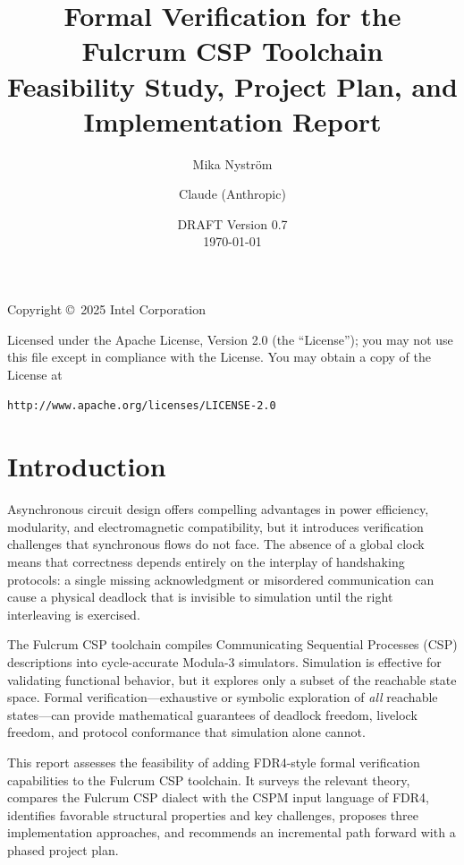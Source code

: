 \documentclass[11pt]{article}
\title{\textbf{Formal Verification for the Fulcrum CSP Toolchain} \\[0.5em]
\large Feasibility Study, Project Plan, and Implementation Report}
\author{Mika Nystr\"om \and Claude (Anthropic)}
\date{DRAFT Version 0.7\\
\today}
\begin{document}
\maketitle

\vspace{1em}

\noindent
 Copyright \copyright\ 2025 Intel Corporation

 Licensed under the Apache License, Version 2.0 (the ``License'');
 you may not use this file except in compliance with the License.
 You may obtain a copy of the License at

 {\tt http://www.apache.org/licenses/LICENSE-2.0}

\tableofcontents
\newpage

\section{Introduction}

Asynchronous circuit design offers compelling advantages in power
efficiency, modularity, and electromagnetic compatibility, but it
introduces verification challenges that synchronous flows do not face.
The absence of a global clock means that correctness depends entirely on
the interplay of handshaking protocols: a single missing acknowledgment
or misordered communication can cause a physical deadlock that is
invisible to simulation until the right interleaving is exercised.

The Fulcrum CSP toolchain compiles Communicating Sequential Processes
(CSP) descriptions into cycle-accurate Modula-3 simulators.  Simulation
is effective for validating functional behavior, but it explores only a
subset of the reachable state space.  Formal verification---exhaustive
or symbolic exploration of \emph{all} reachable states---can provide
mathematical guarantees of deadlock freedom, livelock freedom, and
protocol conformance that simulation alone cannot.

This report assesses the feasibility of adding FDR4-style formal
verification capabilities to the Fulcrum CSP toolchain.  It surveys the
relevant theory, compares the Fulcrum CSP dialect with the CSPM input
language of FDR4, identifies favorable structural properties and
key challenges, proposes three implementation approaches, and
recommends an incremental path forward with a phased project plan.
\end{document}
